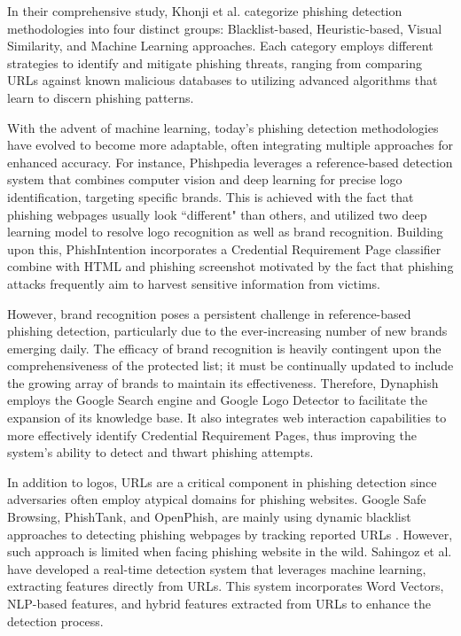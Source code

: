 In their comprehensive study, Khonji et al. \cite{khonji2013phishing} categorize phishing detection methodologies into four distinct groups: Blacklist-based, Heuristic-based, Visual Similarity, and Machine Learning approaches. Each category employs different strategies to identify and mitigate phishing threats, ranging from comparing URLs against known malicious databases to utilizing advanced algorithms that learn to discern phishing patterns. 

With the advent of machine learning, today's phishing detection methodologies have evolved to become more adaptable, often integrating multiple approaches for enhanced accuracy. For instance, Phishpedia \cite{lin2021phishpedia} leverages a reference-based detection system that combines computer vision and deep learning for precise logo identification, targeting specific brands. This is achieved with the fact that phishing webpages usually look ``different" than others, and utilized two deep learning  model to resolve logo recognition as well as brand recognition. Building upon this, PhishIntention \cite{liu2022inferring} incorporates a Credential Requirement Page classifier combine with HTML and phishing screenshot motivated by the fact that phishing attacks frequently aim to harvest sensitive information from victims.

However, brand recognition poses a persistent challenge in reference-based phishing detection, particularly due to the ever-increasing number of new brands emerging daily. The efficacy of brand recognition is heavily contingent upon the comprehensiveness of the protected list; it must be continually updated to include the growing array of brands to maintain its effectiveness. Therefore, Dynaphish \cite{liu2023knowledge} employs the Google Search engine and Google Logo Detector to facilitate the expansion of its knowledge base. It also integrates web interaction capabilities to more effectively identify Credential Requirement Pages, thus improving the system's ability to detect and thwart phishing attempts. 

In addition to logos, URLs are a critical component in phishing detection since adversaries often employ atypical domains for phishing websites. Google Safe Browsing, PhishTank, and OpenPhish, are mainly using dynamic blacklist approaches to detecting phishing webpages by tracking reported URLs \cite{bell2020analysis}. However, such approach is limited when facing phishing website in the wild. Sahingoz et al. \cite{sahingoz2019machine} have developed a real-time detection system that leverages machine learning, extracting features directly from URLs. This system incorporates Word Vectors, NLP-based features, and hybrid features extracted from URLs to enhance the detection process.

